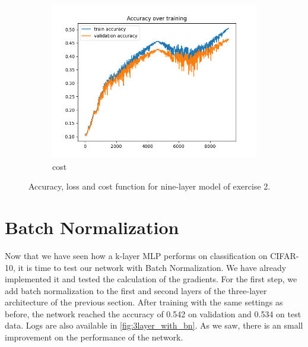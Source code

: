 \documentclass[a4paper]{article}
\begin{document}
\begin{figure}[h]
\begin{subfigure}{0.3\textwidth}
		\includegraphics[width=\linewidth]{images/ex2_9layer_no_batch_acc.png}
		\caption{cost}
	\end{subfigure}
	\caption{Accuracy, loss and cost function for nine-layer model of exercise 2.}
	\label{fig:9layer_no_bn}
\end{figure}

\section{Batch Normalization}

Now that we have seen how a k-layer MLP performs on classification on CIFAR-10, it is time to test our network with Batch Normalization. We have already implemented it and tested the calculation of the gradients.
For the first step, we add batch normalization to the first and second layers of the three-layer architecture of the previous section. After training with the same settings as before, the network reached the accuracy of 0.542 on validation and 0.534 on test data. Logs are also available in \autoref{fig:3layer_with_bn}. As we saw, there is an small improvement on the performance of the network.
\end{document}
